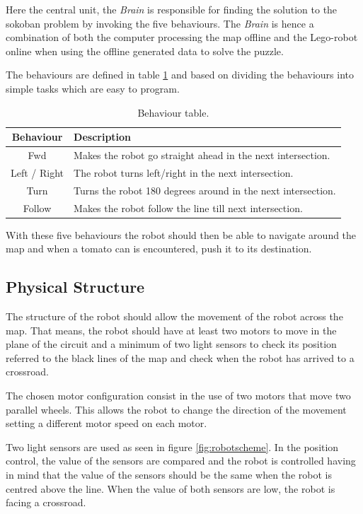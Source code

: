 \documentclass[12pt,a4paper]{article}
\begin{document}
Here the central unit, the \textit{Brain} is responsible for finding the solution to the sokoban problem by invoking the five behaviours.
The \textit{Brain} is hence a combination of both the computer processing the map offline and the Lego-robot online when using the offline generated data to solve the puzzle.

The behaviours are defined in table \ref{tab:behaviourExplained} and based on dividing the behaviours into simple tasks which are easy to program.

\begin{table}[H]
\center
\begin{tabular}{c|l}
Behaviour & Description \\ \hline
Fwd & Makes the robot go straight ahead in the next intersection. \\
Left / Right & The robot turns left/right in the next intersection. \\
Turn & Turns the robot 180 degrees around in the next intersection. \\
Follow & Makes the robot follow the line till next intersection.
\end{tabular}
\caption{Behaviour table.}
\label{tab:behaviourExplained}
\end{table}

With these five behaviours the robot should then be able to navigate around the map and when a tomato can is encountered, push it to its destination.

\subsection{Physical Structure}
The structure of the robot should allow the movement of the robot across the map. 
That means, the robot should have at least two motors to move in the plane of the circuit and a minimum of two light sensors to check its position referred to the black lines of the map and check when the robot has arrived to a crossroad.

The chosen motor configuration consist in the use of two motors that move two parallel wheels. 
This allows the robot to change the direction of the movement setting a different motor speed on each motor.

Two light sensors are used as seen in figure \ref{fig:robotscheme}. 
In the position control, the value of the sensors are compared and the robot is controlled having in mind that the value of the sensors should be the same when the robot is centred above the line.
When the value of both sensors are low, the robot is facing a crossroad.
\end{document}
